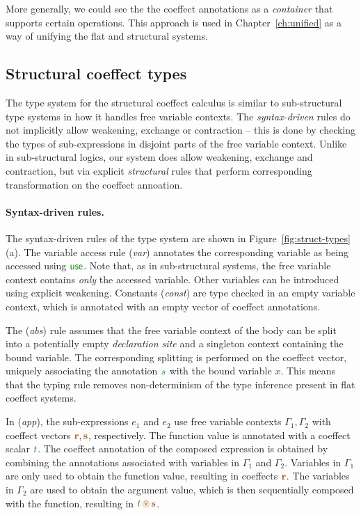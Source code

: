 More generally, we could see the the coeffect annotations as a \emph{container} 
\cite{types-containers} that supports certain operations. This approach is used in 
Chapter~\ref{ch:unified} as a way of unifying the flat and structural systems. 


\subsection{Structural coeffect types}
\label{sec:struct-calculus-types}

The type system for the structural coeffect calculus is similar to sub-structural type systems
in how it handles free variable contexts. The \emph{syntax-driven} rules do not implicitly allow
weakening, exchange or contraction -- this is done by checking the types of sub-expressions
in disjoint parts of the free variable context. Unlike in sub-structural logics, our system
does allow weakening, exchange and contraction, but via explicit \emph{structural} rules that
perform corresponding transformation on the coeffect annoation.

\paragraph{Syntax-driven rules.}
The syntax-driven rules of the type system are shown in Figure~\ref{fig:struct-types} (a).
The variable access rule (\emph{var}) annotates the corresponding variable as being accessed
using $\cunit$. Note that, as in sub-structural systems, the free variable context contains 
\emph{only} the accessed variable. Other variables can be introduced using explicit weakening.
Constants (\emph{const}) are type checked in an empty variable context, which is annotated with
an empty vector of coeffect annotations.

The (\emph{abs}) rule assumes that the free variable context of the body can be split into
a potentially empty \emph{declaration site} and a singleton context containing the bound
variable. The corresponding splitting is performed on the coeffect vector, uniquely associating
the annotation $\cclrd{s}$ with the bound variable $x$. This means that the typing rule removes
non-determinism of the type inference present in flat coeffect systems.

In (\emph{app}), the sub-expressions $e_1$ and $e_2$ use free variable contexts $\Gamma_1, \Gamma_2$
with coeffect vectors $\aclrd{\textbf{r}}, \aclrd{\textbf{s}}$, respectively. The function
value is annotated with a coeffect scalar $\cclrd{t}$.
The coeffect annotation of the composed expression is obtained by combining the annotations
associated with variables in $\Gamma_1$ and $\Gamma_2$. Variables in $\Gamma_1$ are only
used to obtain the function value, resulting in coeffects $\aclrd{\textbf{r}}$. The 
variables in $\Gamma_2$ are used to obtain the argument value, which is then sequentially
composed with the function, resulting in $\cclrd{t}\,\aseq\,\aclrd{\textbf{s}}$.

